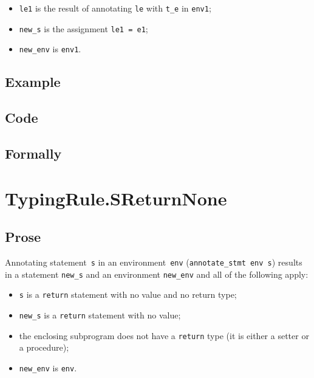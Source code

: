 \documentclass{book}
\begin{document}
\begin{itemize}
\begin{itemize}
\begin{itemize}
       \item \texttt{le1} is the result of annotating \texttt{le} with \texttt{t\_e} in \texttt{env1};
       \item \texttt{new\_s} is the assignment \texttt{le1 = e1};
       \item \texttt{new\_env} is \texttt{env1}.
       \end{itemize}
    \end{itemize}
  \end{itemize}

  \subsection{Example}

  \subsection{Code}

\begin{emptyformal}
  \subsection{Formally}
\end{emptyformal}


\section{TypingRule.SReturnNone \label{sec:TypingRule.SReturnNone}}

  \subsection{Prose}
Annotating statement~\texttt{s} in an environment~\texttt{env}
(\texttt{annotate\_stmt env s}) results in a statement \texttt{new\_s} and an
environment \texttt{new\_env} and all of the following apply:
   \begin{itemize}
   \item \texttt{s} is a \texttt{return} statement with no value and no return type; 
   \item \texttt{new\_s} is a \texttt{return} statement with no value;
   \item the enclosing subprogram does not have a \texttt{return} type (it is either a setter
      or a procedure);
   \item \texttt{new\_env} is \texttt{env}.
   \end{itemize}
\end{document}
